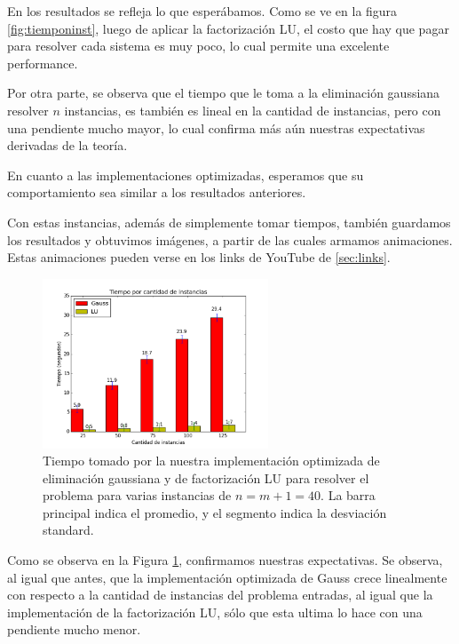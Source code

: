 En los resultados se refleja lo que esperábamos. Como se ve en la figura \ref{fig:tiemponinst}, luego de aplicar la factorización LU, el costo que hay que pagar para resolver cada sistema es muy poco, lo cual permite una excelente performance.

Por otra parte, se observa que el tiempo que le toma a la eliminación gaussiana resolver $n$ instancias, es también es lineal en la cantidad de instancias, pero con una pendiente mucho mayor, lo cual confirma más aún nuestras expectativas derivadas de la teoría.

En cuanto a las implementaciones optimizadas, esperamos que su comportamiento sea similar a los resultados anteriores.

Con estas instancias, además de simplemente tomar tiempos, también guardamos los resultados y obtuvimos imágenes, a partir de las cuales armamos animaciones. Estas animaciones pueden verse en los links de YouTube de \ref{sec:links}.

\begin{figure}[H]
\centering  
 \includegraphics[width=0.6\textwidth]{imgs/tiempos_ninst_opt.png}
 \caption{\footnotesize{Tiempo tomado por la nuestra implementación optimizada de eliminación gaussiana y de factorización LU para resolver el problema para varias instancias de $n = m+1 = 40$. La barra principal indica el promedio, y el segmento indica la desviación standard.}}
\label{fig:tiemponinstopt}
\end{figure}

Como se observa en la Figura \ref{fig:tiemponinstopt}, confirmamos nuestras expectativas. Se observa, al igual que antes, que la implementación optimizada de Gauss crece linealmente con respecto a la cantidad de instancias del problema entradas, al igual que la implementación de la factorización LU, sólo que esta ultima lo hace con una pendiente mucho menor.



